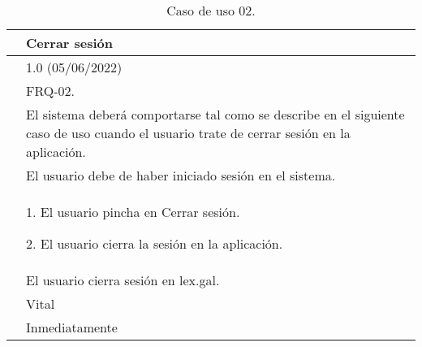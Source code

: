 \begin{table}[H]
\begin{center}
\begin{tabular}{|p{3cm}|p{10cm}|} \hline
\centering {\bf UC-02} & Cerrar sesión  \\ \hline\hline
\centering {\bf Versión} & 1.0 (05/06/2022) \\ \hline
\centering {\bf Dependencias} &  FRQ-02. \\ \hline
\centering {\bf Descripción} &  El sistema deberá comportarse tal como se describe en el siguiente caso de uso cuando el usuario trate de cerrar sesión en la aplicación. \\ \hline
\centering {\bf Precondición} &  El usuario debe de haber iniciado sesión en el sistema. \\ \hline
\centering {\bf Secuencia normal} &  
1. El usuario pincha en Cerrar sesión.

2. El usuario cierra la sesión en la aplicación.
\\ \hline
\centering {\bf Postcondición} &  El usuario cierra sesión en lex.gal. \\ \hline
\centering {\bf Importancia} & Vital \\ \hline
\centering {\bf Urgencia} & Inmediatamente \\ \hline
\end{tabular}
\caption{Caso de uso 02.}
\label{enlaceUC2}
\end{center}
\end{table}

